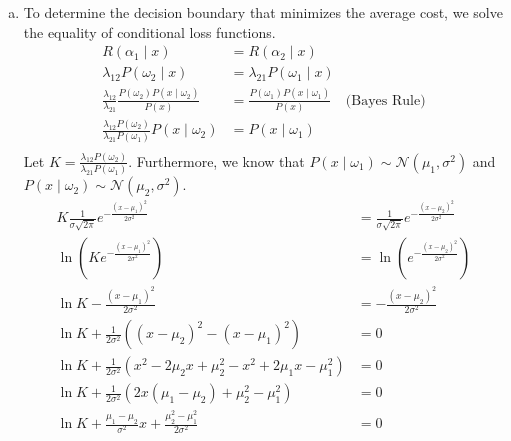 \documentclass[a4paper, 10pt, twoside]{article}
\begin{document}
\begin{enumerate}[a)]
    \item To determine the decision boundary that minimizes the average cost, we solve the equality of conditional loss functions.
          \begin{align*}
              R(\alpha_1 \mid x)                                                          & = R(\alpha_2 \mid x)                                               \\
              \lambda_{12}P(\omega_2 \mid x)                                              & = \lambda_{21}P(\omega_1 \mid x)                                   \\
              \frac{\lambda_{12}}{\lambda_{21}}\frac{P(\omega_2)P(x \mid \omega_2)}{P(x)} & = \frac{P(\omega_1)P(x \mid \omega_1)}{P(x)} & \text{(Bayes Rule)} \\
              \frac{\lambda_{12}P(\omega_2)}{\lambda_{21}P(\omega_1)}P(x \mid \omega_2)   & = P(x \mid \omega_1)                                               \\
          \end{align*}
          Let $K = \frac{\lambda_{12}P(\omega_2)}{\lambda_{21}P(\omega_1)}$. Furthermore, we know that $P(x \mid \omega_1) \sim \mathcal{N}(\mu_1,\sigma^{2})$ and $P(x \mid \omega_2) \sim \mathcal{N}(\mu_2,\sigma^{2})$.
          \begin{align*}
              K\frac{1}{\sigma\sqrt{2\pi}}e^{-\frac{(x-\mu_1)^2}{2\sigma^2}}          & = \frac{1}{\sigma\sqrt{2\pi}}e^{-\frac{(x-\mu_2)^2}{2\sigma^2}} \\
              \ln{(Ke^{-\frac{(x-\mu_1)^2}{2\sigma^2}})}                              & = \ln{(e^{-\frac{(x-\mu_2)^2}{2\sigma^2}})}                     \\
              \ln K - \frac{(x-\mu_1)^2}{2\sigma^2}                                   & = -\frac{(x-\mu_2)^2}{2\sigma^2}                                \\
              \ln K + \frac{1}{2\sigma^2}((x-\mu_2)^2 - (x-\mu_1)^2)                  & = 0                                                           \\
              \ln K + \frac{1}{2\sigma^2}(x^2 -2\mu_2x+\mu_2^2-x^2+2\mu_1x-\mu_1^2)   & = 0                                                           \\
              \ln K + \frac{1}{2\sigma^2}(2x(\mu_1-\mu_2)+\mu_2^2-\mu_1^2)            & = 0                                                           \\
              \ln K + \frac{\mu_1-\mu_2}{\sigma^2}x + \frac{\mu_2^2-\mu_1^2}{2\sigma^2} & = 0                                                           \\

\end{align*}
\end{enumerate}
\end{document}

